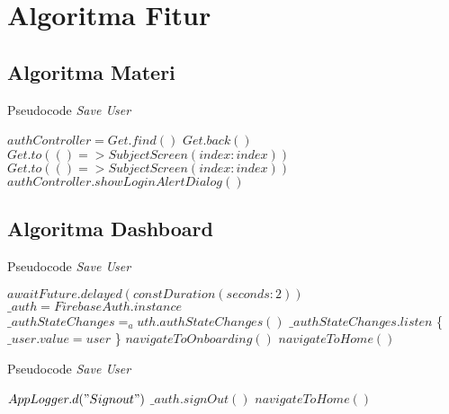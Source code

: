 \section{Algoritma Fitur}

\subsection{Algoritma Materi}
\begin{algorithm}[H]
    \caption{Pseudocode \textit{Save User}}
    \begin{algorithmic}
          \State $authController = Get.find()$
              \State $Get.back()$
              \State $Get.to(() => SubjectScreen(index: index))$
            \Else
              \State $Get.to(() => SubjectScreen(index: index))$
            \EndIf
          \Else
            \State $authController.showLoginAlertDialog()$
          \EndIf
        \EndFunction
    \end{algorithmic}
\end{algorithm}

\subsection{Algoritma Dashboard}
\begin{algorithm}[H]
    \caption{Pseudocode \textit{Save User}}
    \begin{algorithmic}
          \State $await Future.delayed(const Duration(seconds: 2))$
          \State $\_auth = FirebaseAuth.instance$
          \State $\_authStateChanges = _auth.authStateChanges()$
          \State $\_authStateChanges.listen$ \{
            \State $\_user.value = user$
          \}
            \State $navigateToOnboarding()$
          \Else
            \State $navigateToHome()$
          \EndIf
        \EndFunction        
    \end{algorithmic}
\end{algorithm}

\begin{algorithm}[H]
    \caption{Pseudocode \textit{Save User}}
    \begin{algorithmic}
          \State $AppLogger.d("Sign out")$
            \State $\_auth.signOut()$
            \State $navigateToHome()$
        \EndFunction
    \end{algorithmic}
\end{algorithm}

